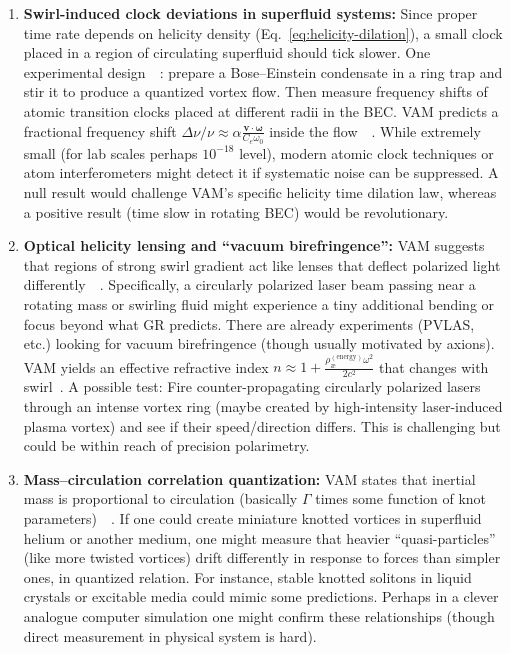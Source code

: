\documentclass[a4paper,12pt]{article}
\begin{document}
    \begin{enumerate}
        \item \textbf{Swirl-induced clock deviations in superfluid systems:}
        Since proper time rate depends on helicity density (Eq.~\ref{eq:helicity-dilation}), a small clock placed in a region of circulating superfluid should tick slower. One experimental design~\cite{reference_240}~\cite{reference_241}: prepare a Bose–Einstein condensate in a ring trap and stir it to produce a quantized vortex flow. Then measure frequency shifts of atomic transition clocks placed at different radii in the BEC. VAM predicts a fractional frequency shift $\Delta \nu/\nu \approx \alpha \frac{\mathbf{v}\cdot\boldsymbol{\omega}}{C_e \omega_0}$ inside the flow~\cite{reference_242}~\cite{reference_243}. While extremely small (for lab scales perhaps $10^{-18}$ level), modern atomic clock techniques or atom interferometers might detect it if systematic noise can be suppressed. A null result would challenge VAM’s specific helicity time dilation law, whereas a positive result (time slow in rotating BEC) would be revolutionary.

        \item \textbf{Optical helicity lensing and “vacuum birefringence”:}
        VAM suggests that regions of strong swirl gradient act like lenses that deflect polarized light differently~\cite{reference_244}~\cite{reference_245}. Specifically, a circularly polarized laser beam passing near a rotating mass or swirling fluid might experience a tiny additional bending or focus beyond what GR predicts. There are already experiments (PVLAS, etc.) looking for vacuum birefringence (though usually motivated by axions). VAM yields an effective refractive index $n \approx 1 + \frac{\rho_{\text{\ae}}^{(\text{energy})}\omega^2}{2c^2}$ that changes with swirl~\cite{reference_246}. A possible test: Fire counter-propagating circularly polarized lasers through an intense vortex ring (maybe created by high-intensity laser-induced plasma vortex) and see if their speed/direction differs. This is challenging but could be within reach of precision polarimetry.

        \item \textbf{Mass–circulation correlation quantization:}
        VAM states that inertial mass is proportional to circulation (basically $\Gamma$ times some function of knot parameters)~\cite{reference_247}~\cite{reference_248}. If one could create miniature knotted vortices in superfluid helium or another medium, one might measure that heavier “quasi-particles” (like more twisted vortices) drift differently in response to forces than simpler ones, in quantized relation. For instance, stable knotted solitons in liquid crystals or excitable media could mimic some predictions. Perhaps in a clever analogue computer simulation one might confirm these relationships (though direct measurement in physical system is hard).


\end{enumerate}
\end{document}
